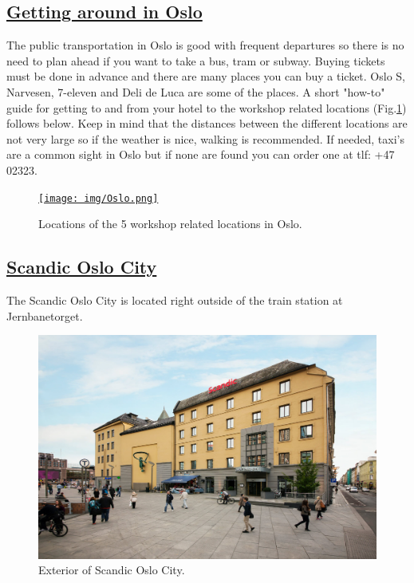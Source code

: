 \documentclass{article}
\begin{document}
\subsection*{\underline{Getting around in Oslo}}

The public transportation in Oslo is good with frequent
departures so there is no need to plan ahead if you want
to take a bus, tram or subway. Buying tickets must be
done in advance and there are many places you can buy a
ticket. Oslo S, Narvesen, 7-eleven and Deli de Luca are some of the places.
A short "how-to" guide for getting to and from your hotel
 to the workshop related
locations (Fig.\ref{fig:Oslo}) follows below. Keep in mind that
the distances
between the different locations are not very large so if the
weather is nice, walking is recommended. If needed, taxi's
are a common sight in Oslo but if none are found you can order one
at tlf: +47 02323.

\begin{figure}[hh]
    \centering
    \href{https://www.google.com/maps/d/edit?hl=no&hl=no&mid=1q9FpcHekR77D16V4eefgqkybvNc&ll=59.91839077669053%2C10.758429782339476&z=15}{\texttt{[image: img/Oslo.png]}}
    \caption{ Locations of the 5 workshop related locations in Oslo.}
    \label{fig:Oslo}
\end{figure}


\subsection*{\underline{Scandic Oslo City}}


The Scandic Oslo City is located right outside of
the train station at Jernbanetorget.

\begin{figure}
\centering
\includegraphics[scale=0.12]{img/Scandic-Oslo-City.jpg}
\caption{\label{fig:frog1}Exterior of Scandic Oslo City.}
\end{figure}
\end{document}
